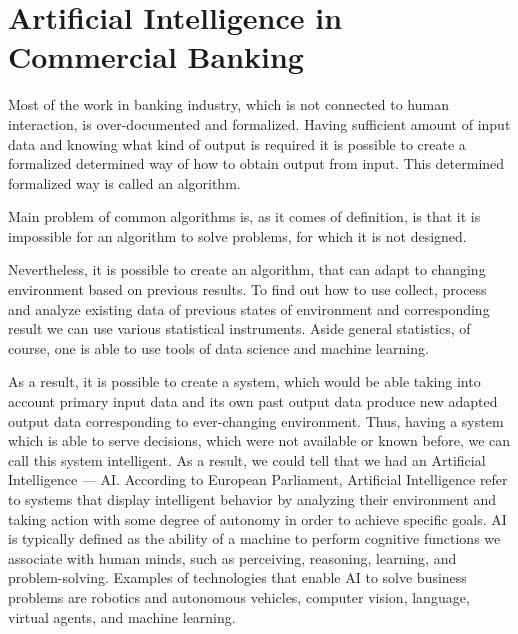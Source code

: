 
\chapter{Artificial Intelligence in Commercial Banking} \label{ch:ml_ai}

Most of the work in banking industry, which is not connected to human interaction, is over-documented and formalized. 
Having sufficient amount of input data and knowing what kind of output is required it is possible to create a formalized determined way of how to obtain output from input. 
This determined formalized way is called an algorithm.

Main problem of common algorithms is, as it comes of definition, is that it is impossible for an algorithm to solve problems, for which it is not designed.

Nevertheless, it is possible to create an algorithm, that can adapt to changing environment based on previous results.
To find out how to use collect, process and analyze existing data of previous states of environment and corresponding result we can use various statistical instruments.
Aside general statistics, of course, one is able to use tools of data science and machine learning.

As a result, it is possible to create a system, which would be able taking into account primary input data and its own past output data produce new adapted output data corresponding to ever-changing environment.
Thus, having a system which is able to serve decisions, which were not available or known before, we can call this system intelligent.
As a result, we could tell that we had an Artificial Intelligence — AI.
According to European Parliament, Artificial Intelligence refer to systems that display intelligent behavior by analyzing their environment and taking action with some degree of autonomy in order to achieve specific goals.
\cite{ai_ep_definition}
AI is typically defined as the ability of a machine to perform cognitive functions we associate with human minds, such as perceiving, reasoning, learning, and problem-solving. 
Examples of technologies that enable AI to solve business problems are robotics and autonomous vehicles, computer vision, language, virtual agents, and machine learning.
\cite{executive_guide_to_ai}


